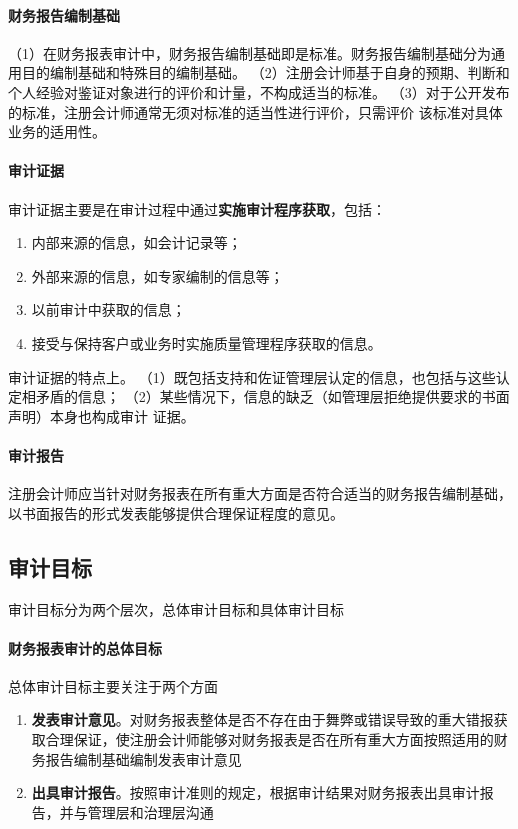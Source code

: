\documentclass[UTF8,12pt]{ctexart}
\numberwithin{equation}{section} %
\numberwithin{figure}{section}
\numberwithin{table}{section}
\begin{document}
	\paragraph{财务报告编制基础}
	（1）在财务报表审计中，财务报告编制基础即是标准。财务报告编制基础分为通用目的编制基础和特殊目的编制基础。
	（2）注册会计师基于自身的预期、判断和个人经验对鉴证对象进行的评价和计量，不构成适当的标准。
	（3）对于公开发布的标准，注册会计师通常无须对标准的适当性进行评价，只需评价
	该标准对具体业务的适用性。
	
	\paragraph{审计证据}
	审计证据主要是在审计过程中通过\textbf{实施审计程序获取}，包括：
	\begin{enumerate}
		\item 内部来源的信息，如会计记录等；
		
		\item 外部来源的信息，如专家编制的信息等；
		
		\item 以前审计中获取的信息；
		
		\item 接受与保持客户或业务时实施质量管理程序获取的信息。
	\end{enumerate}
	
	审计证据的特点上。
	（1）既包括支持和佐证管理层认定的信息，也包括与这些认定相矛盾的信息；
	（2）某些情况下，信息的缺乏（如管理层拒绝提供要求的书面声明）本身也构成审计
	证据。
	
	\paragraph{审计报告}
	注册会计师应当针对财务报表在所有重大方面是否符合适当的财务报告编制基础，以书面报告的形式发表能够提供合理保证程度的意见。
	
	\subsection{审计目标}
	审计目标分为两个层次，总体审计目标和具体审计目标
	
	\paragraph{财务报表审计的总体目标}
	总体审计目标主要关注于两个方面
	\begin{enumerate}
		\item \textbf{发表审计意见}。对财务报表整体是否不存在由于舞弊或错误导致的重大错报获取合理保证，使注册会计师能够对财务报表是否在所有重大方面按照适用的财务报告编制基础编制发表审计意见
		
		\item \textbf{出具审计报告}。按照审计准则的规定，根据审计结果对财务报表出具审计报告，并与管理层和治理层沟通
	\end{enumerate}
	
\end{document}
